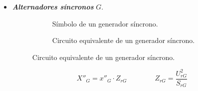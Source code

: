 \begin{itemize}
            \item \textbf{\textit{Alternadores síncronos}} $G$.
                \begin{figure}[H]
                    \begin{minipage}{0.5\textwidth}
                        \begin{figure}[H]
                            \centering
                            \caption{Símbolo de un generador síncrono.}
                            \label{fig:generadorSimbolo}
                        \end{figure}
                    \end{minipage}%
                    \begin{minipage}{0.5\textwidth}
                        \begin{figure}[H]
                            \centering
                            \caption{Circuito equivalente de un generador síncrono.}
                            \label{fig:generadorCto}
                        \end{figure}
                    \end{minipage}%
                \end{figure}
                
                \begin{equation}
                    X''_\textit{G} = x''_\textit{G}\cdot Z_\textit{rG}\qquad \qquad Z_\textit{rG} = \dfrac{U_\textit{rG}^2}{S_\textit{rG}}
                \end{equation}
            

\end{itemize}

